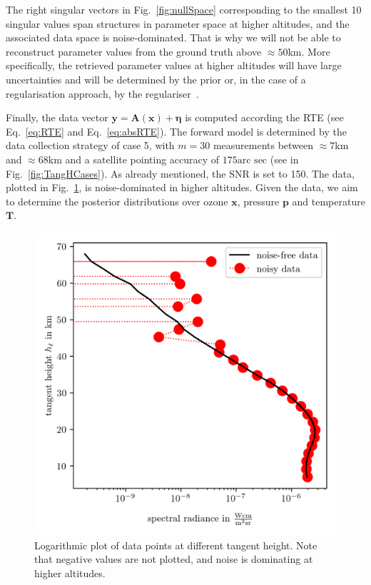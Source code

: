 The right singular vectors in Fig.~\ref{fig:nullSpace} corresponding to the smallest 10 singular values span structures in parameter space at higher altitudes, and the associated data space is noise-dominated.
That is why we will not be able to reconstruct parameter values from the ground truth above $\approx50$km.
More specifically, the retrieved parameter values at higher altitudes will have large uncertainties and will be determined by the prior or, in the case of a regularisation approach, by the regulariser~\cite{tan2016LecNot}.
\clearpage


Finally, the data vector $\bm{y} = \bm{A}(\bm{x}) + \bm{\eta} $ is computed according the RTE (see Eq.~\ref{eq:RTE} and Eq.~\ref{eq:absRTE}).
The forward model is determined by the data collection strategy of case 5, with $m = 30$ measurements between $\approx 7$km and $\approx 68$km and a satellite pointing accuracy of $175\text{arc sec}$ (see in Fig.~\ref{fig:TangHCases}).
As already mentioned, the SNR is set to 150.
The data, plotted in Fig.~\ref{fig:DataPlot}, is noise-dominated in higher altitudes.
Given the data, we aim to determine the posterior distributions over ozone $\bm{x}$, pressure $\bm{p}$ and temperature $\bm{T}$.
\begin{figure}[h!]
	\centering
	\includegraphics{DataPlot.png}
	\caption[Logarithmic plot of the data points at different tangent height.]{Logarithmic plot of data points at different tangent height. Note that negative values are not plotted, and noise is dominating at higher altitudes.}
	\label{fig:DataPlot}
\end{figure}
\clearpage
